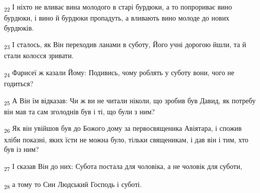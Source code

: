 \begin{tcolorbox}
\textsubscript{22} І ніхто не вливає вина молодого в старі бурдюки, а то попрориває вино бурдюки, і вино й бурдюки пропадуть, а вливають вино молоде до нових бурдюків.
\end{tcolorbox}
\begin{tcolorbox}
\textsubscript{23} І сталось, як Він переходив ланами в суботу, Його учні дорогою йшли, та й стали колосся зривати.
\end{tcolorbox}
\begin{tcolorbox}
\textsubscript{24} Фарисеї ж казали Йому: Подивись, чому роблять у суботу вони, чого не годиться?
\end{tcolorbox}
\begin{tcolorbox}
\textsubscript{25} А Він їм відказав: Чи ж ви не читали ніколи, що зробив був Давид, як потребу він мав та сам зголоднів був і ті, що були з ним?
\end{tcolorbox}
\begin{tcolorbox}
\textsubscript{26} Як він увійшов був до Божого дому за первосвященика Авіятара, і спожив хліби показні, яких їсти не можна було, тільки священикам, і дав він і тим, хто був із ним?
\end{tcolorbox}
\begin{tcolorbox}
\textsubscript{27} І сказав Він до них: Субота постала для чоловіка, а не чоловік для суботи,
\end{tcolorbox}
\begin{tcolorbox}
\textsubscript{28} а тому то Син Людський Господь і суботі.
\end{tcolorbox}
